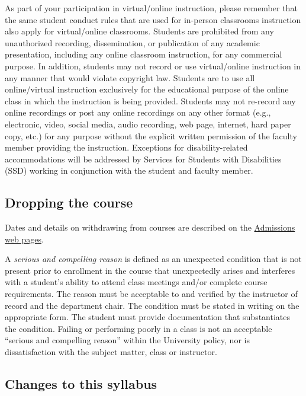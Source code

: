 As part of your participation in virtual/online instruction, please
remember that the same student conduct rules that are used for in-person
classrooms instruction also apply for virtual/online classrooms.
Students are prohibited from any unauthorized recording, dissemination,
or publication of any academic presentation, including any online
classroom instruction, for any commercial purpose. In addition, students
may not record or use virtual/online instruction in any manner that
would violate copyright law. Students are to use all online/virtual
instruction exclusively for the educational purpose of the online class
in which the instruction is being provided. Students may not re-record
any online recordings or post any online recordings on any other format
(e.g., electronic, video, social media, audio recording, web page,
internet, hard paper copy, etc.) for any purpose without the explicit
written permission of the faculty member providing the instruction.
Exceptions for disability-related accommodations will be addressed by
Services for Students with Disabilities (SSD) working in conjunction
with the student and faculty member.

\hypertarget{dropping-the-course}{%
\subsection{Dropping the course}\label{dropping-the-course}}

Dates and details on withdrawing from courses are described on the
\href{http://fresnostate.edu/studentaffairs/are/registration/add-drop-deadlines.html}{Admissions
web pages}.

A \emph{serious and compelling reason} is defined as an unexpected
condition that is not present prior to enrollment in the course that
unexpectedly arises and interferes with a student's ability to attend
class meetings and/or complete course requirements. The reason must be
acceptable to and verified by the instructor of record and the
department chair. The condition must be stated in writing on the
appropriate form. The student must provide documentation that
substantiates the condition. Failing or performing poorly in a class is
not an acceptable ``serious and compelling reason'' within the
University policy, nor is dissatisfaction with the subject matter, class
or instructor.

\hypertarget{changes-to-this-syllabus}{%
\subsection{Changes to this syllabus}\label{changes-to-this-syllabus}}

